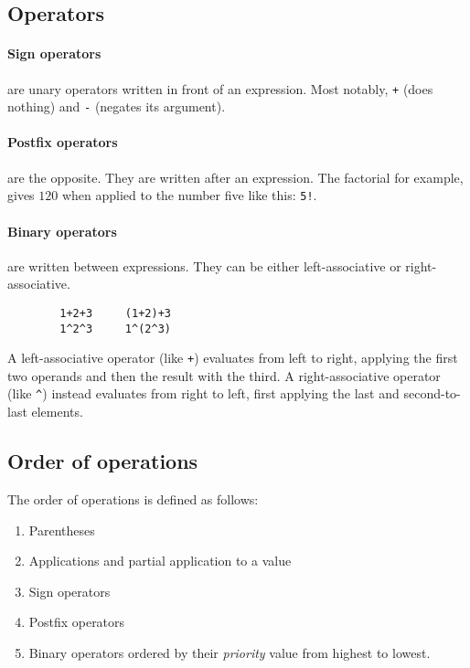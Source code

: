 \documentclass[10pt]{article}
\begin{document}
    \subsection{Operators}\label{subsec:sign-operators}
    \paragraph{Sign operators} are unary operators written in front of an expression.
    Most notably, \verb|+| {\small(does nothing)} and \verb|-| {\small(negates its argument)}.

    \paragraph{Postfix operators} are the opposite.
    They are written after an expression.
    The factorial for example, gives $ 120 $ when applied to the number five like this: \verb|5!|.
    
    \paragraph{Binary operators} are written between expressions.
    They can be either left-associative or right-associative.
    \begin{verbatim}
        1+2+3     (1+2)+3
        1^2^3     1^(2^3)
    \end{verbatim}
    A left-associative operator {\small(like \verb|+|)} evaluates from left to right, applying the first two operands and then the result with the third.
    A right-associative operator {\small(like \verb|^|)} instead evaluates from right to left, first applying the last and second-to-last elements.

    \subsection{Order of operations}\label{subsec:order-of-operations}
    The order of operations is defined as follows:
    \begingroup
    \setlength{\parskip}{0pt}
    \begin{enumerate}
        \item Parentheses
        \item Applications and partial application to a value
        \item Sign operators
        \item Postfix operators
        \item Binary operators ordered by their \textsl{priority} value from highest to lowest.
    \end{enumerate}
    \endgroup
    
\end{document}
